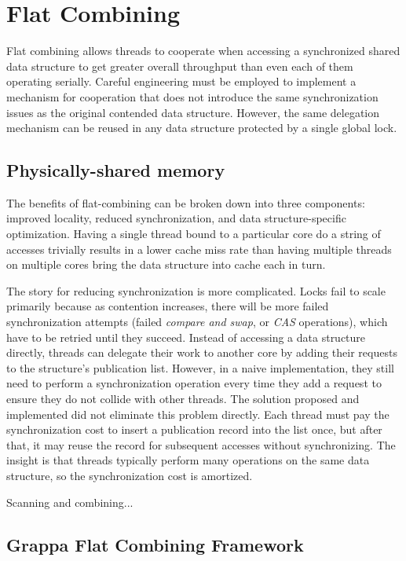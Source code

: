 \section{Flat Combining}

Flat combining allows threads to cooperate when accessing a synchronized shared data structure to get greater overall throughput than even each of them operating serially. Careful engineering must be employed to implement a mechanism for cooperation that does not introduce the same synchronization issues as the original contended data structure. However, the same delegation mechanism can be reused in any data structure protected by a single global lock. 

\subsection{Physically-shared memory}

The benefits of flat-combining can be broken down into three components: improved locality, reduced synchronization, and data structure-specific optimization. Having a single thread bound to a particular core do a string of accesses trivially results in a lower cache miss rate than having multiple threads on multiple cores bring the data structure into cache each in turn.

The story for reducing synchronization is more complicated. Locks fail to scale primarily because as contention increases, there will be more failed synchronization attempts (failed \emph{compare and swap}, or \emph{CAS} operations), which have to be retried until they succeed.
Instead of accessing a data structure directly, threads can delegate their work to another core by adding their requests to the structure's publication list. However, in a naive implementation, they still need to perform a synchronization operation every time they add a request to ensure they do not collide with other threads.
The solution proposed and implemented did not eliminate this problem directly. Each thread must pay the synchronization cost to insert a publication record into the list once, but after that, it may reuse the record for subsequent accesses without synchronizing. The insight is that threads typically perform many operations on the same data structure, so the synchronization cost is amortized. 

Scanning and combining...

\subsection{Grappa Flat Combining Framework}

